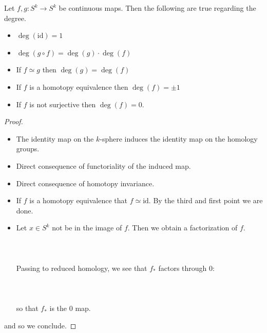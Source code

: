 \documentclass[a4paper]{article}
\begin{document}
\begin{lmm}{}{} Let $f,g:S^k\to S^k$ be continuous maps. Then the following are true regarding the degree. 
\begin{itemize}
\item $\deg(\text{id})=1$
\item $\deg(g\circ f)=\deg(g)\cdot\deg(f)$
\item If $f\simeq g$ then $\deg(g)=\deg(f)$
\item If $f$ is a homotopy equivalence then $\deg(f)=\pm1$
\item If $f$ is not surjective then $\deg(f)=0$. 
\end{itemize} \tcbline
\begin{proof}~\\
\begin{itemize}
\item The identity map on the $k$-sphere induces the identity map on the homology groups. 
\item Direct consequence of functoriality of the induced map. 
\item Direct consequence of homotopy invariance. 
\item If $f$ is a homotopy equivalence that $f\simeq\text{id}$. By the third and first point we are done. 
\item Let $x\in S^k$ not be in the image of $f$. Then we obtain a factorization of $f$. \\~\\
\\~\\
Passing to reduced homology, we see that $f_\ast$ factors through $0$: \\~\\
\\~\\
so that $f_\ast$ is the $0$ map. 
\end{itemize} 
and so we conclude. 
\end{proof}
\end{lmm}
\end{document}
